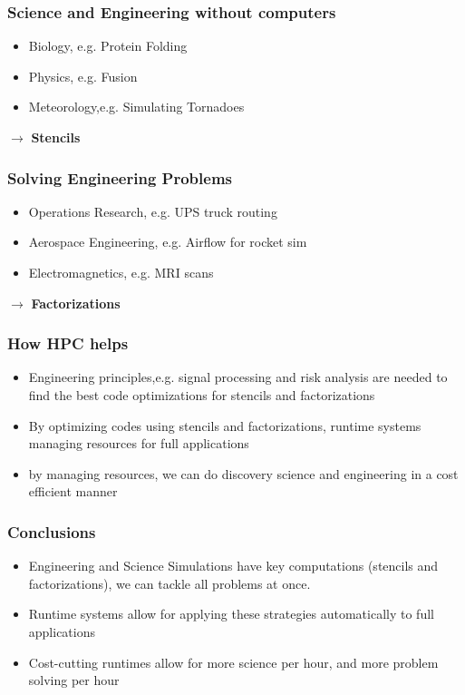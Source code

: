 \begin{frame}
\frametitle{Science and Engineering without computers}
\begin{itemize}
\item \small Biology, e.g. Protein Folding
\item \small Physics, e.g. Fusion
\item \small Meteorology,e.g. Simulating Tornadoes
\end{itemize}
\begin{center}
$\rightarrow$ \textbf{ Stencils}
\end{center}
\end{frame}


\begin{frame}
\frametitle{Solving Engineering Problems}
\begin{itemize}
\item \small Operations Research, e.g. UPS truck routing
\item \small Aerospace Engineering, e.g. Airflow for rocket sim
\item \small Electromagnetics, e.g. MRI scans
\end{itemize}
\begin{center}
$\rightarrow$ \textbf{ Factorizations}
\end{center}
\end{frame}


\begin{frame}
\frametitle{How HPC helps}
\begin{itemize}
\item Engineering principles,e.g. signal processing and risk analysis are needed to find the best code optimizations for stencils and factorizations
\item By optimizing codes using stencils and factorizations, runtime systems managing resources for full applications
\item by managing resources,  we can do discovery science and engineering in a cost efficient manner
\end{itemize}
\end{frame}


\begin{frame}
\frametitle{Conclusions}
\begin{itemize}
\item Engineering and Science Simulations have key computations (stencils and factorizations), we can tackle all problems at once.
\item Runtime systems allow for applying these strategies automatically to full applications
\item Cost-cutting runtimes allow for more science per hour, and more problem solving per hour
\end{itemize}
\end{frame}

